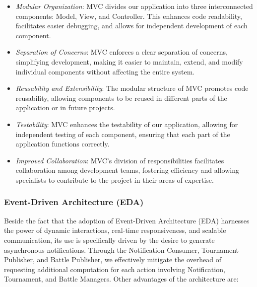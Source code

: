 \begin{itemize}
    \item \textit{Modular Organization}: MVC divides our application into three interconnected components: Model, View, and Controller. This enhances code readability, facilitates easier debugging, and allows for independent development of each component.
  
    \item \textit{Separation of Concerns}: MVC enforces a clear separation of concerns, simplifying development, making it easier to maintain, extend, and modify individual components without affecting the entire system.
  
    \item \textit{Reusability and Extensibility}: The modular structure of MVC promotes code reusability, allowing components to be reused in different parts of the application or in future projects.
  
    \item \textit{Testability}: MVC enhances the testability of our application, allowing for independent testing of each component, ensuring that each part of the application functions correctly.
  
    \item \textit{Improved Collaboration}: MVC's division of responsibilities facilitates collaboration among development teams, fostering efficiency and allowing specialists to contribute to the project in their areas of expertise.
\end{itemize}

\subsubsection*{Event-Driven Architecture (EDA)}

Beside the fact that the adoption of Event-Driven Architecture (EDA) harnesses the power of dynamic interactions, real-time responsiveness, and scalable communication, its use is specifically driven by the desire to generate asynchronous notifications. Through the Notification Consumer, Tournament Publisher, and Battle Publisher, we effectively mitigate the overhead of requesting additional computation for each action involving Notification, Tournament, and Battle Managers. 
Other advantages of the architecture are:

